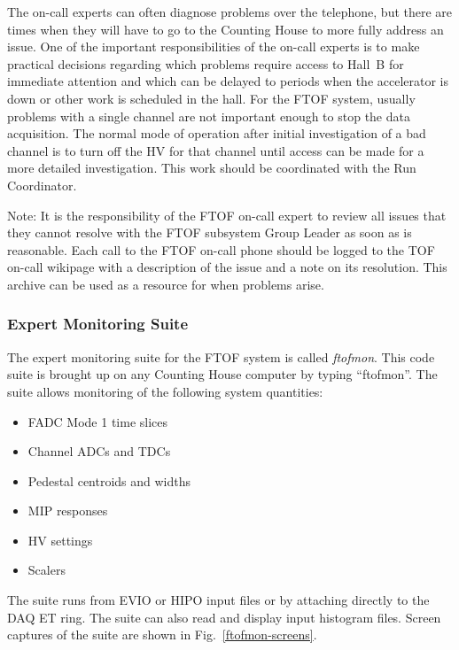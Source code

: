 \documentclass[12pt]{article}
\begin{document}
The on-call experts can often diagnose problems over the telephone, but there are times 
when they will have to go to the Counting House to more fully address an issue. One of 
the important responsibilities of the on-call experts is to make practical decisions 
regarding which problems require access to Hall~B for immediate attention and which can 
be delayed to periods when the accelerator is down or other work is scheduled in the 
hall. For the FTOF system, usually problems with a single channel are not important 
enough to stop the data acquisition. The normal mode of operation after initial 
investigation of a bad channel is to turn off the HV for that channel until access can 
be made for a more detailed investigation. This work should be coordinated with the Run 
Coordinator.

Note: It is the responsibility of the FTOF on-call expert to review all issues that 
they cannot resolve with the FTOF subsystem Group Leader as soon as is reasonable.
Each call to the FTOF on-call phone should be logged to the TOF on-call wikipage
\cite{tof-oncall} with a description of the issue and a note on its resolution. This
archive can be used as a resource for when problems arise.

\subsubsection{Expert Monitoring Suite}
\label{ftofmon}

The expert monitoring suite for the FTOF system is called {\it ftofmon}. This code 
suite is brought up on any Counting House computer by typing ``ftofmon''. The suite
allows monitoring of the following system quantities:

\begin{itemize}
\item FADC Mode 1 time slices
\item Channel ADCs and TDCs
\item Pedestal centroids and widths
\item MIP responses
\item HV settings
\item Scalers
\end{itemize}

The suite runs from EVIO or HIPO input files or by attaching directly to the DAQ ET 
ring. The suite can also read and display input histogram files. Screen captures of 
the suite are shown in Fig.~\ref{ftofmon-screens}. 
\end{document}
